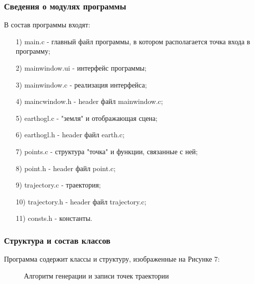 \documentclass[14pt, a4paper]{extarticle}
\begin{document}
	\subsubsection{Сведения о модулях программы}
	В состав программы входят:
	\begin{itemize}
		\item[1)] main.c - главный файл программы, в котором располагается точка входа в программу;
		\item[2)] mainwindow.ui - интерфейс программы;
		\item[3)] mainwindow.c - реализация интерфейса;
		\item[4)] maincwindow.h - header файл mainwindow.c;
		\item[5)] earthogl.c - "земля" и отображающая сцена;
		\item[6)] earthogl.h - header файл earth.c;
		\item[7)] points.c - структура "точка" и функции, связанные с ней;
		\item[8)] point.h - header файл point.c;
		\item[9)] trajectory.c - траектория;
		\item[10)] trajectory.h - header файл trajectory.c;
		\item[11)] consts.h - константы.		 	
	\end{itemize}
	
	\newpage
	\subsubsection{Структура и состав классов}
	Программа содержит классы и структуру, изображенные на Рисунке 7:
	\begin{figure}[h!]
		\caption{Алгоритм генерации и записи точек траектории}
	\end{figure}	
	\clearpage
\end{document}
